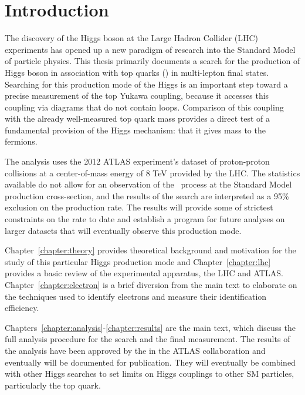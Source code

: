 \chapter[Introduction][Introduction]{Introduction}

The discovery of the Higgs boson at the Large Hadron Collider (LHC) experiments has opened up a new paradigm of research into the
Standard Model of particle physics.
This thesis primarily documents a search for the production of Higgs boson in association with top quarks (\tth) 
in multi-lepton final states.  Searching for this production mode of the Higgs is an important
step toward a precise measurement of the top Yukawa coupling, because it accesses this coupling via diagrams
that do not contain loops. Comparison of this coupling with the already well-measured top quark mass provides
a direct test of a fundamental provision of the Higgs mechanism: that it gives mass to the fermions. 

The analysis uses the 2012 ATLAS experiment's dataset of proton-proton collisions at 
a center-of-mass energy of 8 TeV provided by the LHC. The statistics available do not allow for an observation of the \tth\ process
at the Standard Model production cross-section, and the results of the search are interpreted as
a 95\% exclusion on the production rate. The results will provide some of strictest constraints on the rate to date and
establish a program for future analyses on larger datasets that will eventually observe this production mode. 

Chapter~\ref{chapter:theory} provides theoretical background and motivation for the study of this particular
Higgs production mode and Chapter~\ref{chapter:lhc} provides a basic review of the experimental apparatus,
the LHC and ATLAS. Chapter~\ref{chapter:electron} is a brief diversion
from the main text to elaborate on the techniques used to identify electrons and measure their identification
efficiency. 

Chapters~\ref{chapter:analysis}-\ref{chapter:results} are the main text, which discuss the full analysis
procedure for the search and the final measurement. The results of the analysis have been approved by the
in the ATLAS collaboration and eventually will be documented for publication. They will eventually
be combined with other Higgs searches to set limits on Higgs couplings to other SM particles,
particularly the top quark. 
